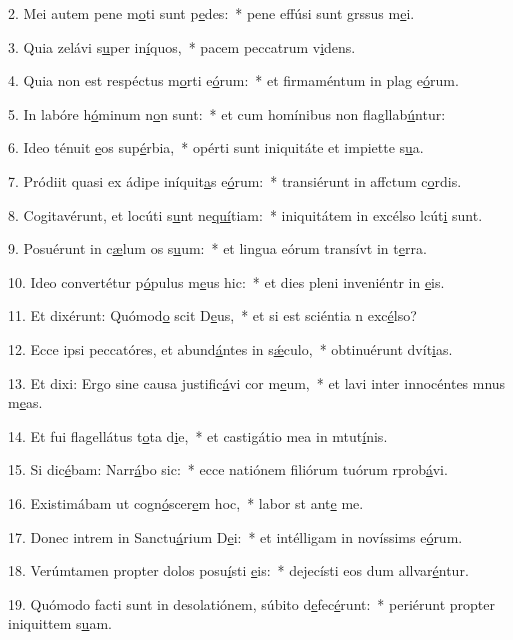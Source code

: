 2. Mei autem pene m\uline{o}ti sunt p\uline{e}des:~* pene effúsi sunt grssus m\uline{e}i.\par 
3. Quia zelávi s\uline{u}per in\uline{í}quos,~* pacem peccatrum v\uline{i}dens.\par 
4. Quia non est respéctus m\uline{o}rti e\uline{ó}rum:~* et firmaméntum in plag e\uline{ó}rum.\par 
5. In labóre h\uline{ó}minum n\uline{o}n sunt:~* et cum homínibus non flagllab\uline{ú}ntur:\par 
6. Ideo ténuit \uline{e}os sup\uline{é}rbia,~* opérti sunt iniquitáte et impiette s\uline{u}a.\par 
7. Pródiit quasi ex ádipe iníquit\uline{a}s e\uline{ó}rum:~* transiérunt in affctum c\uline{o}rdis.\par 
8. Cogitavérunt, et locúti s\uline{u}nt ne\uline{quí}tiam:~* iniquitátem in excélso lcút\uline{i} sunt.\par 
9. Posuérunt in c\uline{æ}lum os s\uline{u}um:~* et lingua eórum transívt in t\uline{e}rra.\par 
10. Ideo convertétur p\uline{ó}pulus m\uline{e}us hic:~* et dies pleni inveniéntr in \uline{e}is.\par 
11. Et dixérunt: Quómod\uline{o} scit D\uline{e}us,~* et si est sciéntia n exc\uline{é}lso?\par 
12. Ecce ipsi peccatóres, et abund\uline{á}ntes in s\uline{ǽ}culo,~* obtinuérunt dvít\uline{i}as.\par 
13. Et dixi: Ergo sine causa justific\uline{á}vi cor m\uline{e}um,~* et lavi inter innocéntes mnus m\uline{e}as.\par 
14. Et fui flagellátus t\uline{o}ta d\uline{i}e,~* et castigátio mea in mtut\uline{í}nis.\par 
15. Si dic\uline{é}bam: Narr\uline{á}bo sic:~* ecce natiónem filiórum tuórum rprob\uline{á}vi.\par 
16. Existimábam ut cogn\uline{ó}scer\uline{e}m hoc,~* labor st ant\uline{e} me.\par 
17. Donec intrem in Sanctu\uline{á}rium D\uline{e}i:~* et intélligam in novíssims e\uline{ó}rum.\par 
18. Verúmtamen propter dolos posu\uline{í}sti \uline{e}is:~* dejecísti eos dum allvar\uline{é}ntur.\par 
19. Quómodo facti sunt in desolatiónem, súbito d\uline{e}fec\uline{é}runt:~* periérunt propter iniquittem s\uline{u}am.\par 
